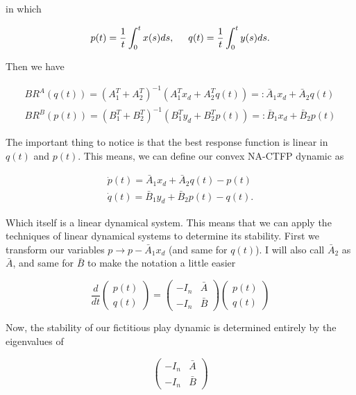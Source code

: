 \documentclass[preprint,12pt]{article}
\theoremstyle{definition}
\theoremstyle{theorem}
\theoremstyle{remark}
\theoremstyle{example}
\begin{document}
	in which 
	
	\begin{equation}
		p(t) = \frac{1}{t} \int_0^t x(s) ds, \hspace{0.5cm} 	q(t) = \frac{1}{t} \int_0^t y(s) ds.
	\end{equation}
	
	Then we have 
	
	\begin{align}
		BR^A(q(t)) = (A_1^T + A_2^T)^{-1} (A_1^T x_d + A_2^T q(t)) =: \bar{A}_1 x_d + \bar{A}_2 q(t) \nonumber \\
		BR^B(p(t)) = (B_1^T + B_2^T)^{-1} (B_1^T y_d + B_2^T p(t)) =: \bar{B}_1 x_d + \bar{B}_2 p(t)
	\end{align}
	
	The important thing to notice is that the best response function is linear in $q(t)$ and $p(t)$. This means, we can define our convex NA-CTFP dynamic as
	
	\begin{align}
		\dot{p}(t) = \bar{A}_1 x_d + \bar{A}_2 q(t) - p(t) \nonumber \\
		\dot{q}(t) = \bar{B}_1 y_d + \bar{B}_2 p(t) - q(t).
	\end{align}
	
	Which itself is a linear dynamical system. This means that we can apply the techniques of linear dynamical systems to determine its stability. First we transform our variables $p \rightarrow p - \bar{A}_1 x_d$ (and same for $q(t)$). I will also call $\bar{A}_2$ as $\bar{A}$, and same for $\bar{B}$ to make the notation a little easier
	
	\begin{equation}
		\frac{d}{dt} \begin{pmatrix}
			p(t) \\ q(t)
		\end{pmatrix} = \begin{pmatrix}
		-I_n & \bar{A} \\ - I_n & \bar{B}
		\end{pmatrix} \begin{pmatrix}
		p(t) \\ q(t)
	\end{pmatrix}
	\end{equation}
	
	Now, the stability of our fictitious play dynamic is determined entirely by the eigenvalues of  
	
		\begin{equation}
		\begin{pmatrix}
			-I_n & \bar{A} \\ - I_n & \bar{B}
		\end{pmatrix} 
	\end{equation}
	
\end{document}
